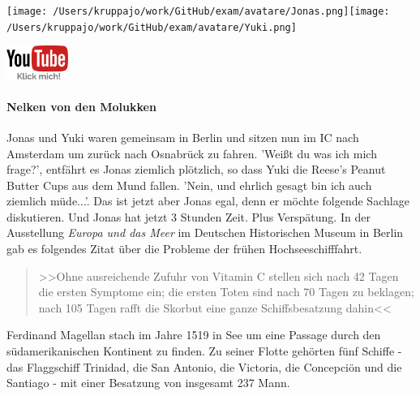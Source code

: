 \documentclass[a4paper, 9pt]{scrartcl}\usepackage[]{graphicx}\usepackage[]{xcolor}
\begin{document}
 
\ifcollection
\begin{flushright}
\tiny\vspace{-3Ex}
\textbf{\examinhaltstart}
\exammodulemathstat
\vspace{-4Ex}
\end{flushright}
\begin{minipage}[t]{0.5\textwidth}
\texttt{[image: /Users/kruppajo/work/GitHub/exam/avatare/Jonas.png]}\hspace{-4mm}\texttt{[image: /Users/kruppajo/work/GitHub/exam/avatare/Yuki.png]}
\end{minipage}
\begin{minipage}[t]{0.5\textwidth}
\hfill
\href{https://youtu.be/1B53cVFIU7Q}{\includegraphics[width = 2cm]{img/youtube}}
\end{minipage}
\fi



\ifcollection
\paragraph{Nelken von den Molukken}
\fi



Jonas und Yuki waren gemeinsam in Berlin und sitzen nun im IC nach Amsterdam um zurück nach Osnabrück zu fahren. 'Weißt du was ich mich frage?', entfährt es Jonas ziemlich plötzlich, so dass Yuki die Reese's Peanut Butter Cups aus dem Mund fallen. 'Nein, und ehrlich gesagt bin ich auch ziemlich müde...'. Das ist jetzt aber Jonas egal, denn er möchte folgende Sachlage diskutieren. Und Jonas hat jetzt 3 Stunden Zeit. Plus Verspätung. In der Ausstellung \textit{Europa und das Meer} im Deutschen Historischen Museum in Berlin gab es folgendes Zitat über die Probleme der frühen Hochseeschifffahrt.

\begin{quote}
  >>Ohne ausreichende Zufuhr von Vitamin C stellen sich nach 42 Tagen die ersten Symptome ein; die ersten Toten sind nach 70 Tagen zu beklagen; nach 105 Tagen rafft die Skorbut eine ganze Schiffsbesatzung dahin<<
\end{quote}

Ferdinand Magellan stach im Jahre 1519 in See um eine Passage durch den südamerikanischen Kontinent zu finden. Zu seiner Flotte gehörten fünf Schiffe - das Flaggschiff Trinidad, die San Antonio, die Victoria, die Concepciön und die Santiago - mit einer Besatzung von insgesamt 237 Mann. 
\end{document}
